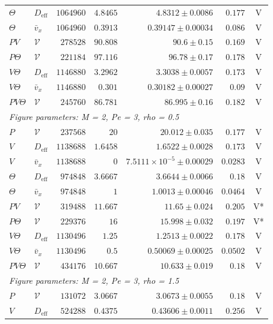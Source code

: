 \begin{longtable}{llrrrrc}
$\Theta$ & $D_{\mathrm{eff}}$ & $1064960$ & $4.8465$ & $4.8312 \pm 0.0086$ & $0.177$ & V \\
$\Theta$ & $\bar v_x$ & $1064960$ & $0.3913$ & $0.39147 \pm 0.00034$ & $0.086$ & V \\
$PV$ & $\mathcal V$ & $278528$ & $90.808$ & $90.6 \pm 0.15$ & $0.169$ & V \\
$P\Theta$ & $\mathcal V$ & $221184$ & $97.116$ & $96.78 \pm 0.17$ & $0.178$ & V \\
$V\Theta$ & $D_{\mathrm{eff}}$ & $1146880$ & $3.2962$ & $3.3038 \pm 0.0057$ & $0.173$ & V \\
$V\Theta$ & $\bar v_x$ & $1146880$ & $0.301$ & $0.30182 \pm 0.00027$ & $0.09$ & V \\
$PV\Theta$ & $\mathcal V$ & $245760$ & $86.781$ & $86.995 \pm 0.16$ & $0.182$ & V \\
\multicolumn{7}{l}{\textit{Figure parameters: M = 2, Pe = 3, rho = 0.5}} \\
$P$ & $\mathcal V$ & $237568$ & $20$ & $20.012 \pm 0.035$ & $0.177$ & V \\
$V$ & $D_{\mathrm{eff}}$ & $1138688$ & $1.6458$ & $1.6522 \pm 0.0028$ & $0.173$ & V \\
$V$ & $\bar v_x$ & $1138688$ & $0$ & $7.5111\times10^{-5} \pm 0.00029$ & $0.0283$ & V \\
$\Theta$ & $D_{\mathrm{eff}}$ & $974848$ & $3.6667$ & $3.6644 \pm 0.0066$ & $0.18$ & V \\
$\Theta$ & $\bar v_x$ & $974848$ & $1$ & $1.0013 \pm 0.00046$ & $0.0464$ & V \\
$PV$ & $\mathcal V$ & $319488$ & $11.667$ & $11.65 \pm 0.024$ & $0.205$ & V* \\
$P\Theta$ & $\mathcal V$ & $229376$ & $16$ & $15.998 \pm 0.032$ & $0.197$ & V* \\
$V\Theta$ & $D_{\mathrm{eff}}$ & $1130496$ & $1.25$ & $1.2513 \pm 0.0022$ & $0.178$ & V \\
$V\Theta$ & $\bar v_x$ & $1130496$ & $0.5$ & $0.50069 \pm 0.00025$ & $0.0502$ & V \\
$PV\Theta$ & $\mathcal V$ & $434176$ & $10.667$ & $10.633 \pm 0.019$ & $0.18$ & V \\
\multicolumn{7}{l}{\textit{Figure parameters: M = 2, Pe = 3, rho = 1.5}} \\
$P$ & $\mathcal V$ & $131072$ & $3.0667$ & $3.0673 \pm 0.0055$ & $0.18$ & V \\
$V$ & $D_{\mathrm{eff}}$ & $524288$ & $0.4375$ & $0.43606 \pm 0.0011$ & $0.256$ & V \\

\end{longtable}
